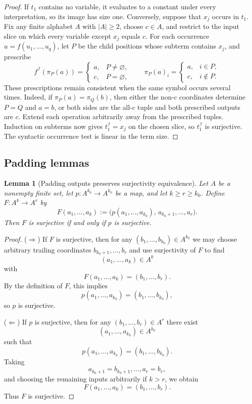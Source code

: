 \documentclass[11pt]{article}
\theoremstyle{definition}
\theoremstyle{plain}
\newtheorem{lemma}[definition]{Lemma}
\begin{document}
\begin{proof}
If $t_1$ contains no variable, it evaluates to a constant under every interpretation, so its image has size one.
Conversely, suppose that $x_j$ occurs in $t_1$.  Fix any finite alphabet $A$ with $|A|\ge2$, choose $c\in A$,
and restrict to the input slice on which every variable except $x_j$ equals $c$.  For each occurrence
$u=f(u_1,\ldots,u_q)$, let $P$ be the child positions whose subterm contains $x_j$, and prescribe
\[
f^\mathcal I(\pi_P(a))=
\begin{cases}
a,&P\ne\varnothing,\\
c,&P=\varnothing,
\end{cases}
\qquad
\pi_P(a)_i=
\begin{cases}
a,&i\in P,\\
c,&i\notin P.
\end{cases}
\]
These prescriptions remain consistent when the same symbol occurs several times.  Indeed, if
$\pi_P(a)=\pi_Q(b)$, then either the non-$c$ coordinates determine $P=Q$ and $a=b$, or both sides are the
all-$c$ tuple and both prescribed outputs are $c$.  Extend each operation arbitrarily away from the prescribed
tuples.  Induction on subterms now gives $t_1^\mathcal I=x_j$ on the chosen slice, so $t_1^\mathcal I$ is
surjective.  The syntactic occurrence test is linear in the term size.
\end{proof}

\subsection{Padding lemmas}
\label{subsec:padding-lemmas}

\begin{lemma}[Padding outputs preserves surjectivity equivalence]
\label{lem:padding-outputs}
Let $A$ be a nonempty finite set, let $p: A^{k_0} \to A^{k_0}$ be a map, and let $k \ge r \ge k_0$.
Define $F: A^k \to A^r$ by
\[
F(a_1, \dots, a_k) := \bigl(p(a_1, \dots, a_{k_0}),\, a_{k_0+1}, \dots, a_r\bigr).
\]
Then $F$ is surjective if and only if $p$ is surjective.
\end{lemma}

\begin{proof}
($\Rightarrow$) If $F$ is surjective, then for any $(b_1,\dots,b_{k_0})\in A^{k_0}$ we may choose arbitrary trailing
coordinates $b_{k_0+1},\dots,b_r$ and use surjectivity of $F$ to find
\[
(a_1,\dots,a_k)\in A^k
\]
with
\[
F(a_1,\dots,a_k)=(b_1,\dots,b_r).
\]
By the definition of $F$, this implies
\[
p(a_1,\dots,a_{k_0})=(b_1,\dots,b_{k_0}),
\]
so $p$ is surjective.

($\Leftarrow$) If $p$ is surjective, then for any $(b_1,\dots,b_r)\in A^r$ there exist
\[
(a_1,\dots,a_{k_0})\in A^{k_0}
\]
such that
\[
p(a_1,\dots,a_{k_0})=(b_1,\dots,b_{k_0}).
\]
Taking
\[
a_{k_0+1}=b_{k_0+1},\dots,a_r=b_r,
\]
and choosing the remaining inputs arbitrarily if $k>r$, we obtain
\[
F(a_1,\dots,a_k)=(b_1,\dots,b_r).
\]
Thus $F$ is surjective.
\end{proof}
\end{document}
